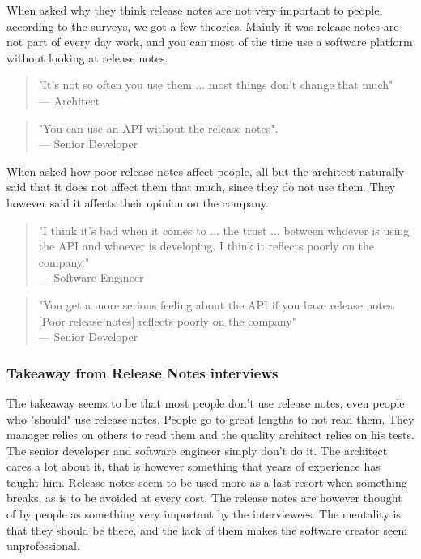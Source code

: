 \documentclass{cslthse-msc}
\begin{document}
    When asked why they think release notes are not very important to people, according to the surveys, we got a few theories. Mainly it was release notes are not part of every day work, and you can most of the time use a software platform without looking at release notes.
    \begin{quote}
        "It's not so often you use them ... most things don't change that much" \\
        --- Architect
    \end{quote}
    \begin{quote}
        "You can use an API without the release notes".\\
        --- Senior Developer
    \end{quote}
    When asked how poor release notes affect people, all but the architect naturally said that it does not affect them that much, since they do not use them. They however said it affects their opinion on the company.
    \begin{quote}
        "I think it's bad when it comes to ... the trust ... between whoever is using the API and whoever is developing. I think it reflects poorly on the company."\\
        --- Software Engineer
    \end{quote}
    \begin{quote}
        "You get a more serious feeling about the API if you have release notes. [Poor release notes] reflects poorly on the company"\\
        --- Senior Developer
    \end{quote}
    \subsubsection{Takeaway from Release Notes interviews}
    The takeaway seems to be that most people don't use release notes, even people who "should" use release notes. People go to great lengths to not read them. They manager relies on others to read them and the quality architect relies on his tests. The senior developer and software engineer simply don't do it. The architect cares a lot about it, that is however something that years of experience has taught him. Release notes seem to be used more as a last resort when something breaks, as is to be avoided at every cost. The release notes are however thought of by people as something very important by the interviewees. The mentality is that they should be there, and the lack of them makes the software creator seem unprofessional.
\end{document}
